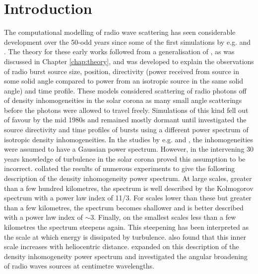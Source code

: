 \section{Introduction}
\label{sec:obsvtheory_intro}
The computational modelling of radio wave scattering has seen considerable development over the 50-odd years since some of the first simulations by e.g. \cite{Fokker1965} and \cite{Steinberg1971}. The theory for these early works followed from a generalisation of \cite{Chandrasekhar1952}, as was discussed in Chapter \ref{chap:theory}, and was developed to explain the observations of radio burst source size, position, directivity (power received from source in some solid angle compared to power from an isotropic source in the same solid angle) and time profile. These models considered scattering of radio photons off of density inhomogeneities in the solar corona as many small angle scatterings before the photons were allowed to travel freely. Simulations of this kind fell out of favour by the mid 1980s and remained mostly dormant until \cite{Thejappa2007} investigated the source directivity and time profiles of bursts using a different power spectrum of isotropic density inhomogeneities. In the studies by e.g. \cite{Fokker1965} and \cite{Steinberg1971}, the inhomogeneities were assumed to have a Gaussian power spectrum. However, in the intervening 30 years knowledge of turbulence in the solar corona proved this assumption to be incorrect. \cite{Coles1989} collated the results of numerous experiments to give the following description of the density inhomogeneity power spectrum. At large scales, greater than a few hundred kilometres, the spectrum is well described by the Kolmogorov spectrum with a power law index of 11/3. For scales lower than these but greater than a few kilometres, the spectrum becomes shallower and is better described with a power law index of $\sim 3$. Finally, on the smallest scales less than a few kilometres the spectrum steepens again. This steepening has been interpreted as the scale at which energy is dissipated by turbulence. \cite{Coles1989} also found that this inner scale increases with heliocentric distance. \cite{Bastian1994} expanded on this description of the density inhomogeneity power spectrum and investigated the angular broadening of radio waves sources at centimetre wavelengths.


